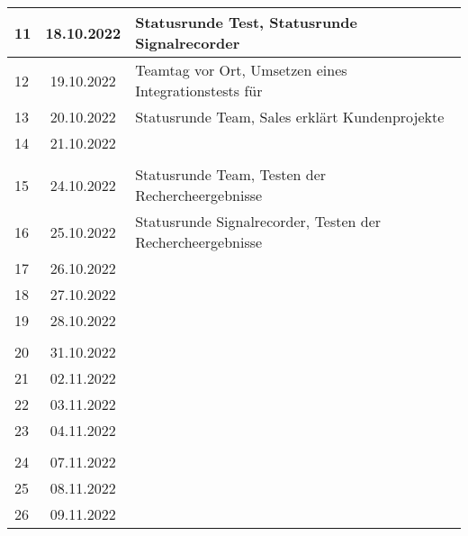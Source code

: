 \begin{longtable}{|l|c|l|}
11  & 18.10.2022    & Statusrunde Test, Statusrunde Signalrecorder                                                      \\ \hline   
12  & 19.10.2022    & Teamtag vor Ort, Umsetzen eines Integrationstests für                                                       \\ \hline   
13  & 20.10.2022    & Statusrunde Team, Sales erklärt Kundenprojekte                                                      \\ \hline   
14  & 21.10.2022    &                                                       \\ \hline  
    &               &                                                       \\ \hline 
15  & 24.10.2022    & Statusrunde Team, Testen der Rechercheergebnisse                                                   \\ \hline   
16  & 25.10.2022    & Statusrunde Signalrecorder, Testen der Rechercheergebnisse                                                      \\ \hline   
17  & 26.10.2022    &                                                       \\ \hline   
18  & 27.10.2022    &                                                       \\ \hline   
19  & 28.10.2022    &                                                       \\ \hline 
    &               &                                                       \\ \hline
20  & 31.10.2022    &                                                       \\ \hline   
21  & 02.11.2022    &                                                       \\ \hline   
22  & 03.11.2022    &                                                       \\ \hline   
23  & 04.11.2022    &                                                       \\ \hline 
&               &                                                       \\ \hline 
24  & 07.11.2022    &                                                       \\ \hline   
25  & 08.11.2022    &                                                       \\ \hline   
26  & 09.11.2022    &                                                       \\ \hline   

\end{longtable}
